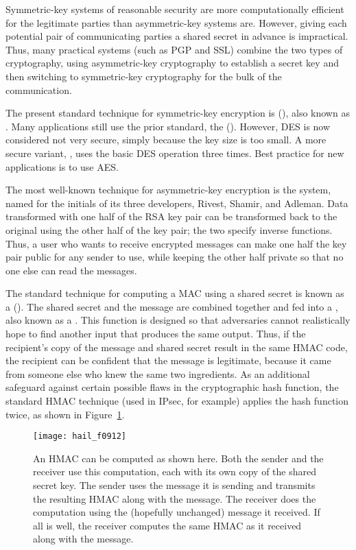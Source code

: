 Symmetric-key systems of reasonable security are more computationally
efficient for the legitimate parties than asymmetric-key systems are.
However, giving each potential pair of communicating parties a shared
secret in advance is impractical.  Thus, many practical systems (such
as PGP and SSL) combine the two types of cryptography, using asymmetric-key cryptography to
establish a secret key and then switching to symmetric-key
cryptography for the bulk of the communication.

The present standard
technique for symmetric-key encryption is 
(), also known as .  Many applications still use the
prior standard, the  ().
However, DES is now considered not very secure, simply because the key
size is too small.  A more secure variant, , uses the
basic DES operation three times.  Best practice for new applications
is to use AES.

The most well-known technique for asymmetric-key encryption is the
 system, named for the initials of its three developers,
Rivest, Shamir, and Adleman.  Data transformed with one half of the
RSA key pair can be transformed back to the original using the other
half of the key pair; the two specify inverse functions.  Thus, a user
who wants to receive encrypted messages can make one half the key pair
public for any sender to use, while keeping the other half private so
that no one else can read the messages.

The standard technique for computing a MAC using a shared secret is
known as a 
().  The shared secret and the message are combined together
and fed into a , also known as
a .  This function is designed so that
adversaries cannot realistically hope to find another input that
produces the same output.  Thus, if the recipient's copy of the
message and shared secret result in the same HMAC code, the recipient
can be confident that the message is legitimate, because it came from
someone else who knew the same two ingredients.  As an additional
safeguard against certain possible flaws in the cryptographic hash
function, the standard HMAC technique (used in IPsec, for example)
applies the hash function twice, as shown in
Figure~\ref{scan-9-10}.
\begin{figure}
\centerline{\texttt{[image: hail\_f0912]}}
\caption{An HMAC can be computed as shown here.  Both the sender and
  the receiver use this computation, each with its own copy of the
  shared secret
  key.  The sender uses the message it is sending and transmits the
  resulting HMAC along with the message.  The
  receiver does the computation using the (hopefully unchanged) message it received.  If all
  is well, the receiver computes the same HMAC as it received along with
  the message.}
\label{scan-9-10}
\end{figure}

